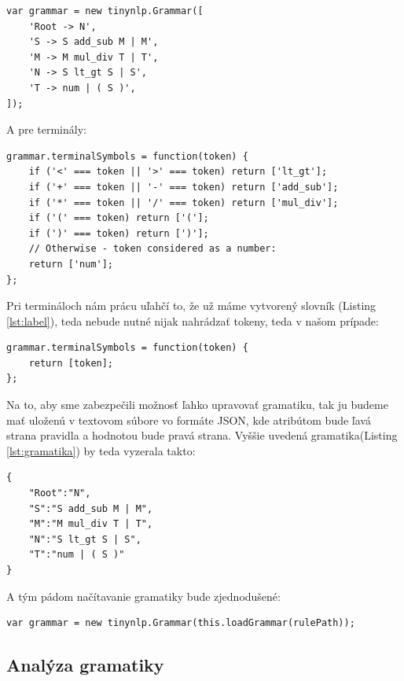 \documentclass[12pt,a4paper]{report}
\theoremstyle{definition}
\theoremstyle{remark}
\begin{document}
\begin{lstlisting}[caption={Ukážková gramatika},label={lst:gramatika},style=htmlcssjs]
var grammar = new tinynlp.Grammar([
    'Root -> N',
    'S -> S add_sub M | M',
    'M -> M mul_div T | T',
    'N -> S lt_gt S | S',
    'T -> num | ( S )',
]);
\end{lstlisting}

\bigskip A pre terminály: 

\begin{lstlisting}[caption={Vytvorenie pravidiel pre terminály}, style=htmlcssjs]
grammar.terminalSymbols = function(token) {
    if ('<' === token || '>' === token) return ['lt_gt'];
    if ('+' === token || '-' === token) return ['add_sub'];
    if ('*' === token || '/' === token) return ['mul_div'];
    if ('(' === token) return ['('];
    if (')' === token) return [')'];
    // Otherwise - token considered as a number:
    return ['num'];
};
\end{lstlisting}

\bigskip Pri termináloch nám prácu uľahčí to, že už máme vytvorený slovník (Listing \ref{lst:label}), teda nebude nutné nijak nahrádzať tokeny, teda v našom prípade: \\
\begin{lstlisting}[style=htmlcssjs]
grammar.terminalSymbols = function(token) {
    return [token];
};
\end{lstlisting}
\bigskip
Na to, aby sme zabezpečili možnosť ľahko upravovať gramatiku, tak ju budeme mať uloženú v textovom súbore vo formáte JSON, kde atribútom bude ľavá strana pravidla a hodnotou bude pravá strana. Vyššie uvedená gramatika(Listing \ref{lst:gramatika}) by teda vyzerala takto:
\newpage
\begin{lstlisting}[caption={Ukážková gramatika V JSON-e},label={lst:gramatikaJSON},style=htmlcssjs]
{
	"Root":"N",
	"S":"S add_sub M | M",
	"M":"M mul_div T | T",
	"N":"S lt_gt S | S",
	"T":"num | ( S )"
}
\end{lstlisting}

A tým pádom načítavanie gramatiky bude zjednodušené: \\

\begin{lstlisting}[style=htmlcssjs]
var grammar = new tinynlp.Grammar(this.loadGrammar(rulePath));
\end{lstlisting}

\subsection{Analýza gramatiky}
\end{document}
